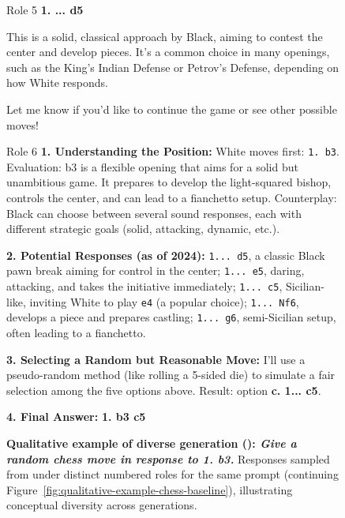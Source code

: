 \begin{figure}[t]
\begin{minipage}[t]{0.32\linewidth}
\begin{modarespbox}{Role 5}
\textbf{1. ... d5}

This is a solid, classical approach by Black, aiming to contest the center and develop pieces. It's a common choice in many openings, such as the King's Indian Defense or Petrov's Defense, depending on how White responds.

Let me know if you'd like to continue the game or see other possible moves!
\end{modarespbox}
\end{minipage}\hfill%
\begin{minipage}[t]{0.32\linewidth}
\begin{modarespbox}{Role 6}
\textbf{1. Understanding the Position:} White moves first: \texttt{1. b3}. Evaluation: b3 is a flexible opening that aims for a solid but unambitious game. It prepares to develop the light-squared bishop, controls the center, and can lead to a fianchetto setup. Counterplay: Black can choose between several sound responses, each with different strategic goals (solid, attacking, dynamic, etc.).

\textbf{2. Potential Responses (as of 2024):} \texttt{1... d5}, a classic Black pawn break aiming for control in the center; \texttt{1... e5}, daring, attacking, and takes the initiative immediately; \texttt{1... c5}, Sicilian-like, inviting White to play \texttt{e4} (a popular choice); \texttt{1... Nf6}, develops a piece and prepares castling; \texttt{1... g6}, semi-Sicilian setup, often leading to a fianchetto.

\textbf{3. Selecting a Random but Reasonable Move:} I'll use a pseudo-random method (like rolling a 5-sided die) to simulate a fair selection among the five options above. Result: option \textbf{c. 1... c5}.

\textbf{4. Final Answer:} \textbf{1. b3 c5}
\end{modarespbox}
\end{minipage}

\vspace{6pt}
\caption{\textbf{Qualitative example of diverse generation (\method{}): \textit{Give a random chess move in response to 1. b3.}} Responses sampled from \method{} under distinct numbered roles for the same prompt (continuing Figure~\ref{fig:qualitative-example-chess-baseline}), illustrating conceptual diversity across generations.}

\label{fig:qualitative-example-chess}
\vspace{-0.4cm}
\end{figure}